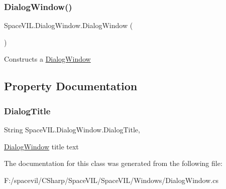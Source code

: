 \subsubsection{\texorpdfstring{Dialog\+Window()}{DialogWindow()}}
{\footnotesize\ttfamily Space\+V\+I\+L.\+Dialog\+Window.\+Dialog\+Window (\begin{DoxyParamCaption}{ }\end{DoxyParamCaption})}



Constructs a \mbox{\hyperlink{class_space_v_i_l_1_1_dialog_window}{Dialog\+Window}} 



\subsection{Property Documentation}
\mbox{\label{class_space_v_i_l_1_1_dialog_window_a91fb9fd6d98afaad9d89a88891bb3250}} 
\subsubsection{\texorpdfstring{Dialog\+Title}{DialogTitle}}
{\footnotesize\ttfamily String Space\+V\+I\+L.\+Dialog\+Window.\+Dialog\+Title\hspace{0.3cm}{\ttfamily [get]}, {\ttfamily [set]}}



\mbox{\hyperlink{class_space_v_i_l_1_1_dialog_window}{Dialog\+Window}} title text 



The documentation for this class was generated from the following file\+:\begin{DoxyCompactItemize}
\item 
F\+:/spacevil/\+C\+Sharp/\+Space\+V\+I\+L/\+Space\+V\+I\+L/\+Windows/Dialog\+Window.\+cs\end{DoxyCompactItemize}
